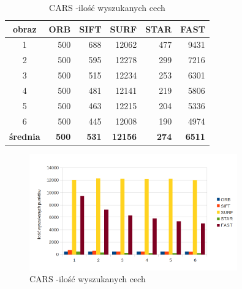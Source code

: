 \begin{table}[htbp]
  \centering
  \caption{CARS -ilość wyszukanych cech}
    \begin{tabular}{|c|r|r|r|r|r|}\hline
    
    obraz & \textbf{ORB} & \textbf{SIFT} & \textbf{SURF} & \textbf{STAR} & \textbf{FAST} \\\hline
    
   
    1 & 500 & 688 & 12062 & 477 & 9431 \\
    2 & 500 & 595 & 12278 & 299 & 7216 \\
    3 & 500 & 515 & 12234 & 253 & 6301 \\
    4 & 500 & 481 & 12141 & 219 & 5806 \\
    5 & 500 & 463 & 12215 & 204 & 5336 \\
    6 & 500 & 445 & 12008 & 190 & 4974 \\\hline
    \textbf{średnia} & \textbf{500} & \textbf{531} & \textbf{12156} & \textbf{274} & \textbf{6511} \\
    \hline
    \end{tabular}%
  \label{tab:cars_f1}%
\end{table}%


\begin{figure}
\centering
\includegraphics[width=0.8\textwidth]{pict/mikolajczyk/light/F1.png}
\caption{CARS -ilość wyszukanych cech}
\label{fig:cars_f1}
\end{figure}


